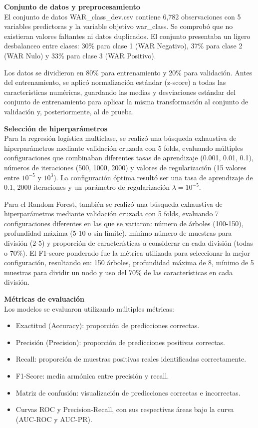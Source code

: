 \vspace{0.3cm}
\noindent \textbf{Conjunto de datos y preprocesamiento} \\
El conjunto de datos WAR\_class\_dev.csv contiene 6,782 observaciones con 5 variables predictoras y la variable objetivo war\_class. Se comprobó que no existieran valores faltantes ni datos duplicados. El conjunto presentaba un ligero desbalanceo entre clases: 30\% para clase 1 (WAR Negativo), 37\% para clase 2 (WAR Nulo) y 33\% para clase 3 (WAR Positivo).

Los datos se dividieron en 80\% para entrenamiento y 20\% para validación. Antes del entrenamiento, se aplicó normalización estándar (z-score) a todas las características numéricas, guardando las medias y desviaciones estándar del conjunto de entrenamiento para aplicar la misma transformación al conjunto de validación y, posteriormente, al de prueba.

\vspace{0.3cm}
\noindent \textbf{Selección de hiperparámetros} \\
Para la regresión logística multiclase, se realizó una búsqueda exhaustiva de hiperparámetros mediante validación cruzada con 5 folds, evaluando múltiples configuraciones que combinaban diferentes tasas de aprendizaje (0.001, 0.01, 0.1), números de iteraciones (500, 1000, 2000) y valores de regularización (15 valores entre $10^{-5}$ y $10^{3}$). La configuración óptima resultó ser una tasa de aprendizaje de 0.1, 2000 iteraciones y un parámetro de regularización $\lambda = 10^{-5}$.

Para el Random Forest, también se realizó una búsqueda exhaustiva de hiperparámetros mediante validación cruzada con 5 folds, evaluando 7 configuraciones diferentes en las que se variaron: número de árboles (100-150), profundidad máxima (5-10 o sin límite), mínimo número de muestras para división (2-5) y proporción de características a considerar en cada división (todas o 70\%). El F1-score ponderado fue la métrica utilizada para seleccionar la mejor configuración, resultando en: 150 árboles, profundidad máxima de 8, mínimo de 5 muestras para dividir un nodo y uso del 70\% de las características en cada división.

\vspace{0.3cm}
\noindent \textbf{Métricas de evaluación} \\
Los modelos se evaluaron utilizando múltiples métricas:
\begin{itemize}
    \item Exactitud (Accuracy): proporción de predicciones correctas.
    \item Precisión (Precision): proporción de predicciones positivas correctas.
    \item Recall: proporción de muestras positivas reales identificadas correctamente.
    \item F1-Score: media armónica entre precisión y recall.
    \item Matriz de confusión: visualización de predicciones correctas e incorrectas.
    \item Curvas ROC y Precision-Recall, con sus respectivas áreas bajo la curva (AUC-ROC y AUC-PR).
\end{itemize}

